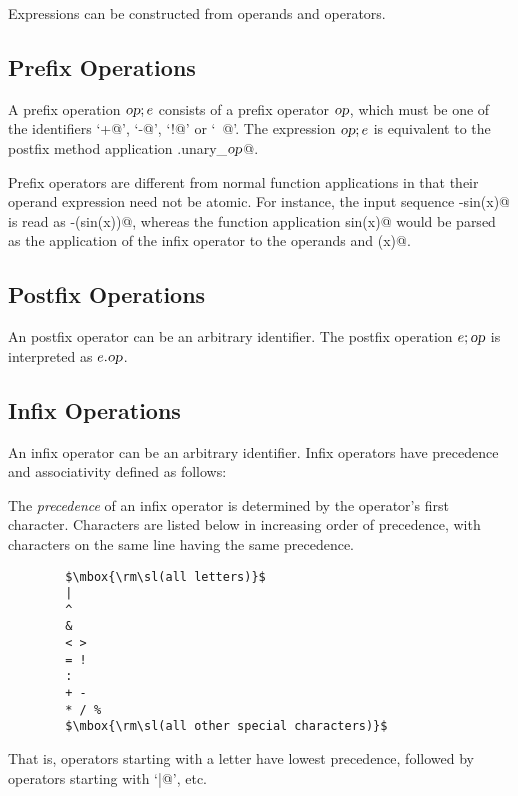 Expressions can be constructed from operands and operators. 

\subsection{Prefix Operations}

A prefix operation $\mbox{\sl op};e$ consists of a prefix operator $\mbox{\sl op}$, which
must be one of the identifiers `\lstinline@+@', `\lstinline@-@',
`\lstinline@!@' or `\lstinline@~@'. The expression $\mbox{\sl op};e$ is
equivalent to the postfix method application
\lstinline@e.unary_$\mbox{\sl op}$@.


Prefix operators are different from normal function applications in
that their operand expression need not be atomic. For instance, the
input sequence \lstinline@-sin(x)@ is read as \lstinline@-(sin(x))@, whereas the
function application \lstinline@negate sin(x)@ would be parsed as the
application of the infix operator  to the operands
 and \lstinline@(x)@.


\subsection{Postfix Operations}

An postfix operator can be an arbitrary identifier. The postfix
operation $e;\mbox{\sl op}$ is interpreted as $e.\mbox{\sl op}$. 

\subsection{Infix Operations}

An infix operator can be an arbitrary identifier. Infix operators have
precedence and associativity defined as follows:

The {\em precedence} of an infix operator is determined by the operator's first
character. Characters are listed below in increasing order of
precedence, with characters on the same line having the same precedence.
\begin{lstlisting}
        $\mbox{\rm\sl(all letters)}$
        |
        ^
        &
        < >
        = !
        :
        + -
        * / %
        $\mbox{\rm\sl(all other special characters)}$
\end{lstlisting}
That is, operators starting with a letter have lowest precedence,
followed by operators starting with `\lstinline@|@', etc.

